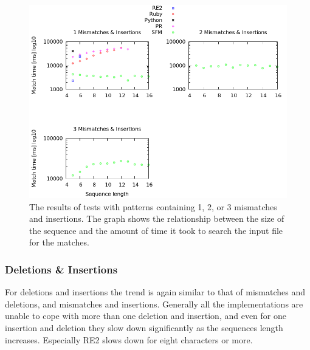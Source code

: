 \documentclass[12pt]{article}
\theoremstyle{definition}
\begin{document}
\begin{figure}[H]
	\begin{center}
		\includegraphics[scale=0.55]{graphs/mismatches_insertions.png}	
	\end{center}
	\caption{The results of tests with patterns containing 1, 2, or 3 mismatches and insertions. The graph shows the relationship between the size of the sequence and the amount of time it took to search the input file for the matches.}
	\label{graph:cases:combinations}
\end{figure}

\subsubsection{Deletions \& Insertions}

For deletions and insertions the trend is again similar to that of mismatches and deletions, and mismatches and insertions. Generally all the implementations are unable to cope with more than one deletion and insertion, and even for one insertion and deletion they slow down significantly as the sequences length increases. Especially RE2 slows down for eight characters or more.
\end{document}
